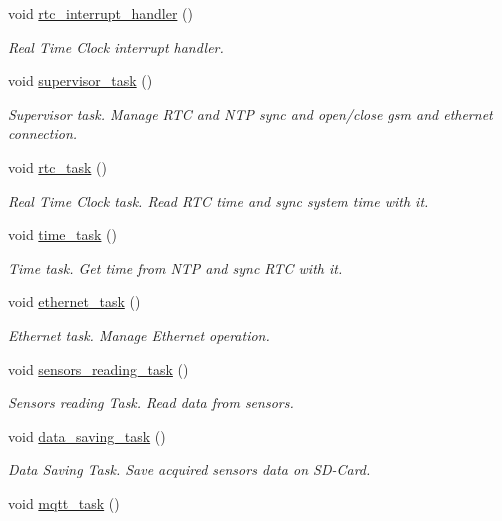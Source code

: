 \begin{DoxyCompactItemize}
void \hyperlink{rmap_8ino_a17374e428acd4fc86f2b8a8ede54deca}{rtc\+\_\+interrupt\+\_\+handler} ()
\begin{DoxyCompactList}\small\item\em Real Time Clock interrupt handler. \end{DoxyCompactList}\item 
void \hyperlink{rmap_8ino_a2f44f14407ed3f1ae93126c1533e697b}{supervisor\+\_\+task} ()
\begin{DoxyCompactList}\small\item\em Supervisor task. Manage R\+TC and N\+TP sync and open/close gsm and ethernet connection. \end{DoxyCompactList}\item 
void \hyperlink{rmap_8ino_a52f7fb7ebbd710f2a06b3f6e47c7e7e3}{rtc\+\_\+task} ()
\begin{DoxyCompactList}\small\item\em Real Time Clock task. Read R\+TC time and sync system time with it. \end{DoxyCompactList}\item 
void \hyperlink{rmap_8ino_a35c29025c5ef3d135b8c2b038be3f8df}{time\+\_\+task} ()
\begin{DoxyCompactList}\small\item\em Time task. Get time from N\+TP and sync R\+TC with it. \end{DoxyCompactList}\item 
void \hyperlink{rmap_8ino_abac8959915b759aa6429243ab9599ee3}{ethernet\+\_\+task} ()
\begin{DoxyCompactList}\small\item\em Ethernet task. Manage Ethernet operation. \end{DoxyCompactList}\item 
void \hyperlink{rmap_8ino_ad3efe51e17cb8205a24267c2992a12d4}{sensors\+\_\+reading\+\_\+task} ()
\begin{DoxyCompactList}\small\item\em Sensors reading Task. Read data from sensors. \end{DoxyCompactList}\item 
void \hyperlink{rmap_8ino_a1c6cee0cbd43bbe1215f13cab2434347}{data\+\_\+saving\+\_\+task} ()
\begin{DoxyCompactList}\small\item\em Data Saving Task. Save acquired sensors data on S\+D-\/\+Card. \end{DoxyCompactList}\item 
void \hyperlink{rmap_8ino_a161bca6629368a46242fec07a965966a}{mqtt\+\_\+task} ()

\end{DoxyCompactItemize}
